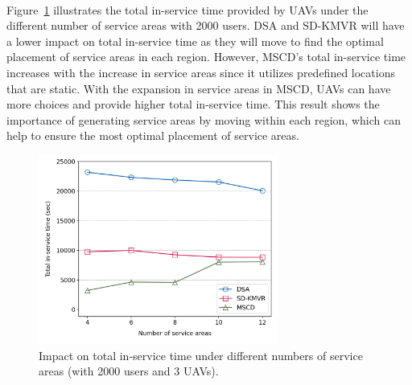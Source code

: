 \documentclass[a4paper,12pt]{report}
\begin{document}
\paragraph{}
Figure~\ref{fig:Impact on total in-service time with different numbers of SA} illustrates the total in-service time provided by UAVs under the different number of service areas with 2000 users. DSA and SD-KMVR will have a lower impact on total in-service time as they will move to find the optimal placement of service areas in each region. However, MSCD's total in-service time increases with the increase in service areas since it utilizes predefined locations that are static. With the expansion in service areas in MSCD, UAVs can have more choices and provide higher total in-service time. This result shows the importance of generating service areas by moving within each region, which can help to ensure the most optimal placement of service areas.
\begin{figure} [h!]
    \centering
    \includegraphics[width=0.7\textwidth]{Figure 10.png}
    \caption{Impact on total in-service time under different numbers of service areas (with 2000 users and 3 UAVs).}
    \label{fig:Impact on total in-service time with different numbers of SA}
\end{figure}
\end{document}
